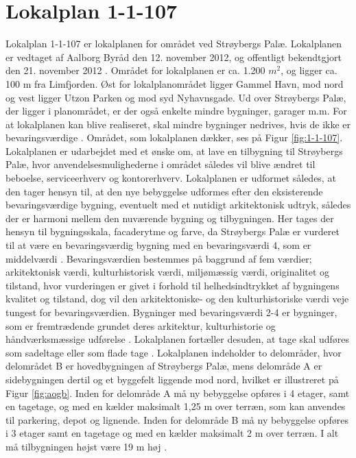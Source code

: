 \section{Lokalplan 1-1-107}
Lokalplan 1-1-107 er lokalplanen for området ved Strøybergs Palæ. Lokalplanen er vedtaget af Aalborg Byråd den 12. november 2012, og offentligt bekendtgjort den 21. november 2012 \citep[ s. 20]{lokalplan}.
\newline \indent{     }  Området for lokalplanen er ca. 1.200 $m^2$, og ligger ca. 100 m fra Limfjorden. Øst for lokalplanområdet ligger Gammel Havn, mod nord og vest ligger Utzon Parken og mod syd Nyhavnsgade. Ud over Strøybergs Palæ, der ligger i planområdet, er der også enkelte mindre bygninger, garager m.m. For at lokalplanen kan blive realiseret, skal mindre bygninger nedrives, hvis de ikke er bevaringsværdige \citep[ s. 6]{lokalplan}. Området, som lokalplanen dækker, ses på Figur \ref{fig:1-1-107}.
\newline \indent{     }  Lokalplanen er udarbejdet med et ønske om, at lave en tilbygning til Strøybergs Palæ, hvor anvendelsesmulighederne i området således vil blive ændret til beboelse, serviceerhverv og kontorerhverv. Lokalplanen er udformet således, at den tager hensyn til, at den nye bebyggelse udformes efter den eksisterende bevaringsværdige bygning, eventuelt med et nutidigt arkitektonisk udtryk, således der er harmoni mellem den nuværende bygning og tilbygningen. Her tages der hensyn til bygningsskala, facaderytme og farve, da Strøybergs Palæ er vurderet til at være en bevaringsværdig bygning med en bevaringsværdi 4, som er middelværdi \citep[ s. 5 og 9]{lokalplan}. Bevaringsværdien bestemmes på baggrund af fem værdier; arkitektonisk værdi, kulturhistorisk værdi, miljømæssig værdi, originalitet og tilstand, hvor vurderingen er givet i forhold til helhedsindtrykket af bygningens kvalitet og tilstand, dog vil den arkitektoniske- og den kulturhistoriske værdi veje tungest for bevaringsværdien. Bygninger med bevaringsværdi 2-4 er bygninger, som er fremtrædende grundet deres arkitektur, kulturhistorie og håndværksmæssige udførelse \citep{bevaringsvaerdi}. Lokalplanen fortæller desuden, at tage skal udføres som sadeltage eller som flade tage \citep[ s. 17]{lokalplan}.
\newline \indent{     }  Lokalplanen indeholder to delområder, hvor delområdet B er hovedbygningen af Strøybergs Palæ, mens delområde A er sidebygningen dertil og et byggefelt liggende mod nord, hvilket er illustreret på Figur \ref{fig:aogb}. Inden for delområde A må ny bebyggelse opføres i 4 etager, samt en tagetage, og med en kælder maksimalt 1,25 m over terræn, som kan anvendes til parkering, depot og lignende. Inden for delområde B må ny bebyggelse opføres i 3 etager samt en tagetage og med en kælder maksimalt 2 m over terræn. I alt må tilbygningen højst være 19 m høj \citep[ s. 7 og 16]{lokalplan}.

